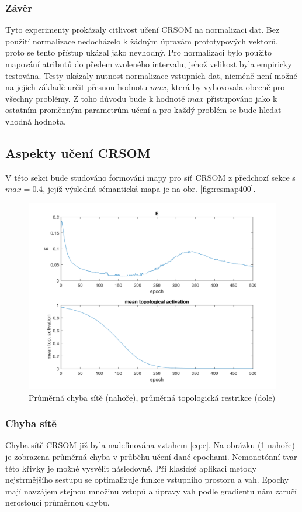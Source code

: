 \documentclass[thesis=M,czech]{FITthesis}[2012/06/26]
\begin{document}
\subsubsection*{Závěr}
Tyto experimenty prokázaly citlivost učení CRSOM na normalizaci dat. Bez použití normalizace nedocházelo k žádným úpravám prototypových vektorů, proto se tento přístup ukázal jako nevhodný. Pro normalizaci bylo použito mapování atributů do předem zvoleného intervalu, jehož velikost byla empiricky testována. Testy ukázaly nutnost normalizace vstupních dat, nicméně není možné na jejich základě určit přesnou hodnotu $max$, která by vyhovovala obecně pro všechny problémy. Z toho důvodu bude k hodnotě $max$ přistupováno jako k ostatním proměnným parametrům učení a pro každý problém se bude hledat vhodná hodnota.


\subsection{Aspekty učení CRSOM}
V této sekci bude studováno formování mapy pro síť CRSOM z předchozí sekce s $max=0.4$, jejíž výsledná sémantická mapa je na obr. \ref{fig:resmap400}. 

\begin{figure}[htp]    
    \centering
   \includegraphics[scale=0.25]{mse_top.png}
     \caption{Průměrná chyba sítě (nahoře), průměrná topologická restrikce (dole)} 
    \label{fig:msetopp}
\end{figure}

\subsubsection*{Chyba sítě}
Chyba sítě CRSOM již byla nadefinována vztahem \ref{eq:e}. Na obrázku (\ref{fig:msetopp} nahoře) je zobrazena průměrná chyba v průběhu učení dané epochami. Nemonotónní tvar této křivky je možné vysvělit následovně. Při klasické aplikaci metody nejstrmějšího sestupu se optimalizuje funkce vstupního prostoru a vah. Epochy mají navzájem stejnou množinu vstupů a úpravy vah podle gradientu nám zaručí nerostoucí průměrnou chybu.
\end{document}
